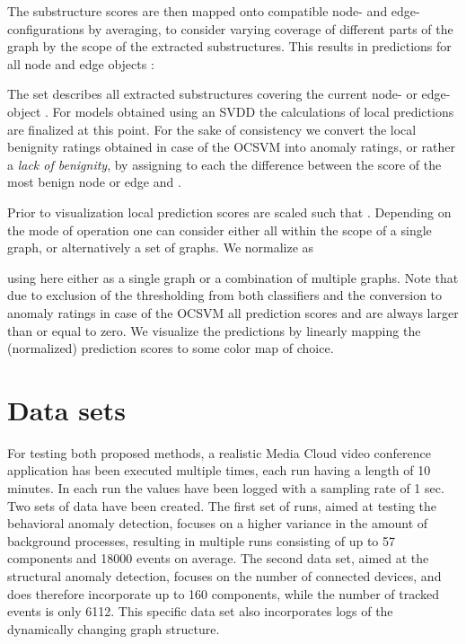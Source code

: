\documentclass{llncs}
\begin{document}
The substructure scores  are then mapped onto compatible node- and edge-configurations by averaging, to consider varying coverage of different parts of the graph by the scope of the extracted substructures. This results in predictions  for all node and edge objects :

The set  describes all extracted substructures covering the current node- or edge-object . For models obtained using an SVDD the calculations of local predictions are finalized at this point. For the sake of consistency we convert the local benignity ratings obtained in case of the OCSVM into anomaly ratings, or rather a \emph{lack of benignity}, by assigning to each  the difference between the score of the most benign node or edge and .



Prior to visualization local prediction scores  are scaled such that . Depending on the mode of operation one can consider either all  within the scope of a single graph, or alternatively a set of graphs. We normalize as

using  here either as a single graph or a combination of  multiple graphs. Note that due to exclusion of the thresholding from both classifiers and the conversion to anomaly ratings in case of the OCSVM all prediction scores  and  are always larger than or equal to zero. We visualize the predictions by linearly mapping the (normalized) prediction scores to some color map of choice.
 

 
\section{Data sets}
\label{sec:datasets}
For testing both proposed methods, a realistic Media Cloud video conference application has been executed multiple times, each run having a length of 10 minutes. In each run the values  have been logged with a sampling rate of 1 sec. Two sets of data have been created. The first set of runs, aimed at testing the behavioral anomaly detection, focuses on a higher variance in the amount of background processes, resulting in multiple runs consisting of up to 57 components and 18000 events on average. The second data set, aimed at the structural anomaly detection, focuses on the number of connected devices, and does therefore incorporate up to 160 components, while the number of tracked events is only 6112. This specific data set also incorporates logs of the dynamically changing graph structure.
\end{document}
